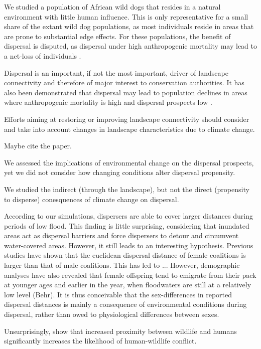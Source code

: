 \documentclass[abstract=on,10pt,a4paper,bibliography=totocnumbered]{article}
\begin{document}
We studied a population of African wild dogs that resides in a natural
environment with little human influence. This is only representative for a small
share of the extant wild dog populations, as most individuals reside in areas
that are prone to substantial edge effects. For these populations, the benefit
of dispersal is disputed, as dispersal under high anthropogenic mortality may
lead to a net-loss of individuals \citep{Leigh.2012}.

Dispersal is an important, if not the most important, driver of landscape
connectivity and therefore of major interest to conservation authorities. It has
also been demonstrated that dispersal may lead to population declines in areas
where anthropogenic mortality is high and dispersal prospects low
\citep{Leigh.2012}.


Efforts aiming at restoring or improving landscape connectivity should consider
and take into account changes in landscape characteristics due to climate
change.

Maybe cite the \cite{Gusset.2009} paper.

We assessed the implications of environmental change on the dispersal prospects,
yet we did not consider how changing conditions alter dispersal propensity.

We studied the indirect (through the landscape), but not the direct (propensity
to disperse) conesquences of climate change on dispersal.

According to our simulations, dispersers are able to cover larger distances
during periods of low flood. This finding is little surprising, considering that
inundated areas act as dispersal barriers and force dispersers to detour and
circumvent water-covered areas. However, it still leads to an interesting
hypothesis. Previous studies have shown that the euclidean dispersal distance of
female coalitions is larger than that of male coalitions. This has led to ...
However, demographic analyses have also revealed that female offspring tend to
emigrate from their pack at younger ages and earlier in the year, when
floodwaters are still at a relatively low level (Behr). It is thus conceivable
that the sex-differences in reported dispersal distances is mainly a consequence
of environmental conditions during dispersal, rather than owed to physiological
differences between sexes.

Unsurprisingly, \cite{Michalski.2006} show that increased proximity between
wildlife and humans significantly increases the likelihood of human-wildlife
conflict.
\end{document}

